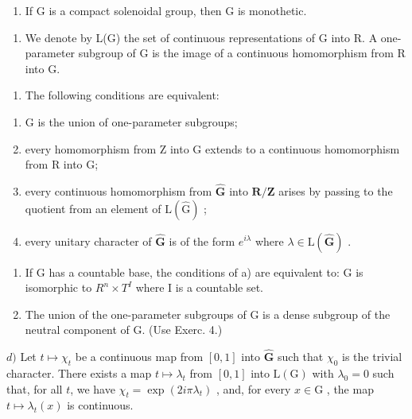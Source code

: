 \begin{enumerate}
\def\labelenumi{\alph{enumi})}
\setcounter{enumi}{4}
\tightlist
\item
  If G is a compact solenoidal group, then G is monothetic.
\end{enumerate}

\begin{enumerate}
\def\labelenumi{\arabic{enumi})}
\setcounter{enumi}{10}
\tightlist
\item
  We denote by L(G) the set of continuous representations of G into R. A one-parameter subgroup of G is the image of a continuous homomorphism from R into G.
\end{enumerate}

\begin{enumerate}
\def\labelenumi{\alph{enumi})}
\tightlist
\item
  The following conditions are equivalent:
\end{enumerate}

\begin{enumerate}
\def\labelenumi{(\roman{enumi})}
\item
  G is the union of one-parameter subgroups;
\item
  every homomorphism from Z into G extends to a continuous homomorphism from R into G;
\item
  every continuous homomorphism from \(\widehat{\mathbf{G}}\) into \(\mathbf{R} / \mathbf{Z}\) arises by passing to the quotient from an element of \(\mathrm{L}(\widehat{\mathrm{G}})\) ;
\item
  every unitary character of \(\widehat{\mathbf{G}}\) is of the form \(e^{i\lambda}\) where \(\lambda \in \mathrm{L}(\widehat{\mathbf{G}})\) .
\end{enumerate}

\begin{enumerate}
\def\labelenumi{\alph{enumi})}
\setcounter{enumi}{1}
\item
  If G has a countable base, the conditions of a) are equivalent to: G is isomorphic to \(R^{n} \times T^{I}\) where I is a countable set.
\item
  The union of the one-parameter subgroups of G is a dense subgroup of the neutral component of G. (Use Exerc. 4.)
\end{enumerate}

\(d)\) Let \(t \mapsto \chi_t\) be a continuous map from \([0,1]\) into \(\widehat{\mathbf{G}}\) such that \(\chi_0\) is the trivial character. There exists a map \(t \mapsto \lambda_t\) from \([0,1]\) into \(\mathrm{L}(\mathrm{G})\) with \(\lambda_0 = 0\) such that, for all \(t\), we have \(\chi_t = \exp(2i\pi\lambda_t)\) , and, for every \(x \in \mathrm{G}\) , the map \(t \mapsto \lambda_t(x)\) is continuous.

